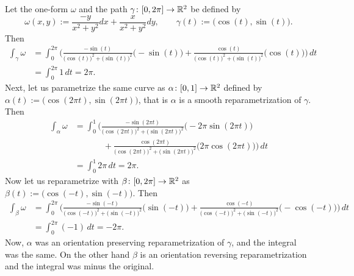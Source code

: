 \begin{example} \label{example:mv:irrotoneformint}
Let the one-form $\omega$ and the path $\gamma \colon [0,2\pi] \to {\mathbb{R}}^2$ be defined by
\begin{equation*}
\omega(x,y) := \frac{-y}{x^2+y^2} dx + \frac{x}{x^2+y^2} dy,
\qquad
\gamma(t) := \bigl(\cos(t),\sin(t)\bigr) .
\end{equation*}
Then
\begin{equation*}
\begin{split}
\int_{\gamma} \omega
& =
\int_0^{2\pi}
\Biggl(
\frac{-\sin(t)}{{\bigl(\cos(t)\bigr)}^2+{\bigl(\sin(t)\bigr)}^2}
\bigl(-\sin(t)\bigr)
+
\frac{\cos(t)}{{\bigl(\cos(t)\bigr)}^2+{\bigl(\sin(t)\bigr)}^2}
\bigl(\cos(t)\bigr)
\Biggr) \, dt
\\
& =
\int_0^{2\pi}
1 \, dt
= 2\pi .
\end{split}
\end{equation*}
Next, let us parametrize the same curve as
$\alpha \colon [0,1] \to {\mathbb{R}}^2$ defined by $\alpha(t) := \bigl(\cos(2\pi
t),\sin(2 \pi t)\bigr)$, that is $\alpha$ is a smooth reparametrization of
$\gamma$.  Then
\begin{equation*}
\begin{split}
\int_{\alpha} \omega
& =
\int_0^{1}
\Biggl(
\frac{-\sin(2\pi t)}{{\bigl(\cos(2\pi t)\bigr)}^2+{\bigl(\sin(2\pi t)\bigr)}^2}
\bigl(-2\pi \sin(2\pi t)\bigr)
\\
& \phantom{=\int_0^1\Biggl(~}
+
\frac{\cos(2 \pi t)}{{\bigl(\cos(2 \pi t)\bigr)}^2+{\bigl(\sin(2 \pi t)\bigr)}^2}
\bigl(2 \pi \cos(2 \pi t)\bigr)
\Biggr) \, dt
\\
& =
\int_0^{1}
2\pi \, dt
= 2\pi .
\end{split}
\end{equation*}
Now let us reparametrize with $\beta \colon [0,2\pi] \to {\mathbb{R}}^2$
as $\beta(t) := \bigl(\cos(-t),\sin(-t)\bigr)$.  Then
\begin{equation*}
\begin{split}
\int_{\beta} \omega
& =
\int_0^{2\pi}
\Biggl(
\frac{-\sin(-t)}{{\bigl(\cos(-t)\bigr)}^2+{\bigl(\sin(-t)\bigr)}^2}
\bigl(\sin(-t)\bigr)
+
\frac{\cos(-t)}{{\bigl(\cos(-t)\bigr)}^2+{\bigl(\sin(-t)\bigr)}^2}
\bigl(-\cos(-t)\bigr)
\Biggr) \, dt
\\
& =
\int_0^{2\pi}
(-1) \, dt
= -2\pi .
\end{split}
\end{equation*}
Now, $\alpha$ was an orientation preserving reparametrization of
$\gamma$, and the integral was the same.  On the other hand $\beta$
is an orientation reversing reparametrization and the integral was
minus the original.
\end{example}

